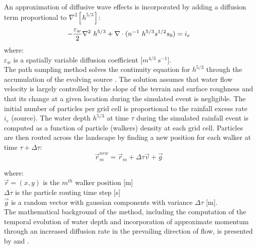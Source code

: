 \documentclass[gmd, manuscript]{copernicus}
\begin{document}
\noindent
An approximation of diffusive wave effects is incorporated by adding a diffusion term proportional to
$ \nabla^2 [h^{5/3}]$:
\begin{equation}
\label{eq:difwater}
-{\varepsilon_w\over 2 }\nabla^2 ~ h^{5/3}
+\nabla \cdot (n^{-1}~h^{5/3}s^{1/2}\vec{s_0}) = i_e
\end{equation}
{\small
\noindent
 where: \\
 \noindent
 \hspace*{0.5em} $\varepsilon_w$ is a spatially variable diffusion coefficient [$\unit{m}^{4/3}~\unit{s}^{-1}$]. \\
}
The path sampling method solves the continuity equation for $h^{5/3}$ 
through the accumulation of the evolving source \citep{Mitasova2004}.
The solution assumes that water flow velocity 
is largely controlled by the slope of the terrain and surface roughness 
and that its change at a given location during the simulated event is negligible. 
The initial number of particles per grid cell is proportional to the rainfall excess rate $i_e$ (source).
The water depth $h^{5/3}$ at time $\tau$ during the simulated rainfall event
is computed as a function of particle (walkers) density at each grid cell. 
Particles are then routed across the landscape 
by finding a new position for each walker at time $\tau + \Delta \tau$:
\begin{equation}
\vec{r}_m^{new}=\vec{r}_m + \Delta \tau \vec{v} + \vec{g}
\end{equation}

{\small
\noindent
where: \\
\noindent
\hspace*{0.5em} $\vec{r} = (x, y)$ is the $m^{th}$ walker position [\unit{m}]\\
\hspace*{0.5em} $\Delta \tau$ is the particle routing time step [\unit{s}]\\
\hspace*{0.5em} $\vec{g}$ is a random vector with gaussian components with variance $\Delta \tau$ [\unit{m}].\\
}
%
\noindent
The mathematical background of the method, 
including the computation 
of the temporal evolution of water depth
and incorporation of approximate momentum 
through an increased diffusion rate in the prevailing direction of flow,
is presented by \citet{Mitas1998} and \citet{Mitasova2004}.
\end{document}
